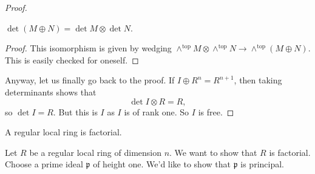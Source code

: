 \begin{proof}
\begin{lemma} 
$\det(M \oplus N) = \det M \otimes \det N$.
\end{lemma} 
\begin{proof} 
This isomorphism is given by wedging $\wedge^{\mathrm{top}} M \otimes
\wedge^{\mathrm{top}} N \to \wedge^{\mathrm{top}}(M \oplus N)$. This is easily
checked for oneself.
\end{proof} 

Anyway, let us finally go back to the proof. If $I \oplus R^n = R^{n+1}$, then
taking determinants shows that
\[ \det I \otimes R = R,  \]
so $\det I = R$. But this is $I$ as $I$ is of rank one. So $I$ is free.

\end{proof} 

\begin{theorem} 
A regular local ring is factorial.
\end{theorem} 

Let $R$ be a regular local ring of dimension $n$. We want to show that $R$ is factorial. 
Choose a prime ideal $\mathfrak{p}$ of height one. 
We'd like to show that $\mathfrak{p}$ is principal. 

